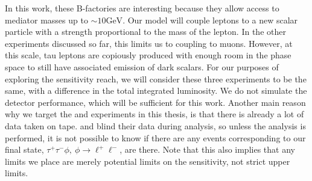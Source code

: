 In this work, these B-factories are interesting because they allow access to mediator masses up to $\sim 10\textrm{GeV}$.
Our model will couple leptons to a new scalar particle with a strength proportional to the mass of the lepton.
In the other experiments discussed so far, this limits us to coupling to muons.
However, at this scale, tau leptons are copiously produced with enough room in the phase space to still have associated emission of dark scalars.
For our purposes of exploring the sensitivity reach, we will consider these three experiments to be the same, with a difference in the total integrated luminosity.
We do not simulate the detector performance, which will be sufficient for this work.
Another main reason why we target the \babar and \belle experiments in this thesis, is that there is already a lot of data taken on tape.
\babar and \belle blind their data during analysis, so unless the analysis is performed, it is not possible to know if there are any events corresponding to our final state, $\tau^+ \tau^- \phi,~\phi \rightarrow \ell^+ \ell^-$, are there.
Note that this also implies that any limits we place are merely potential limits on the sensitivity, not strict upper limits.
